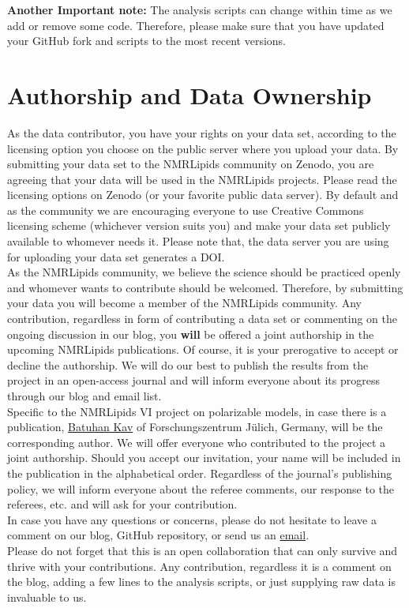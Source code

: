 \documentclass[12pt]{article}
\begin{document}
\textbf{Another Important note:} The analysis scripts can change within time as we add or remove some code. Therefore, please make sure that you have updated your GitHub fork and scripts to the most recent versions.

\section{Authorship and Data Ownership}

As the data contributor, you have your rights on your data set, according to the licensing option you choose on the public server where you upload your data. By submitting your data set to the NMRLipids community on Zenodo, you are agreeing that your data will be used in the NMRLipids projects. Please read the licensing options on Zenodo (or your favorite public data server). By default and as the community we are encouraging everyone to use Creative Commons licensing scheme (whichever version suits you) and make your data set publicly available to whomever needs it. Please note that, the data server you are using for uploading your data set generates a DOI.\\

As the NMRLipids community, we believe the science should be practiced openly and whomever wants to contribute should be welcomed. Therefore, by submitting your data you will become a member of the NMRLipids community. Any contribution, regardless in form of contributing a data set or commenting on the ongoing discussion in our blog, you \textbf{will} be offered a joint authorship in the upcoming NMRLipids publications. Of course, it is your prerogative to accept or decline the authorship. We will do our best to publish the results from the project in an open-access journal and will inform everyone about its progress through our blog and email list.\\

Specific to the NMRLipids VI project on polarizable models, in case there is a publication, \href{http://www.strodel.info/bkav.php}{Batuhan Kav} of Forschungszentrum Jülich, Germany, will be the corresponding author. We will offer everyone who contributed to the project a joint authorship. Should you accept our invitation, your name will be included in the publication in the alphabetical order. Regardless of the journal's publishing policy, we will inform everyone about the referee comments, our response to the referees, etc. and will ask for your contribution.\\

In case you have any questions or concerns, please do not hesitate to leave a comment on our blog, GitHub repository, or send us an \href{mailto:b.kav@fz-juelich.de}{email}.\\

Please do not forget that this is an open collaboration that can only survive and thrive with your contributions. Any contribution, regardless it is a comment on the blog, adding a few lines to the analysis scripts, or just supplying raw data is invaluable to us.\\
\end{document}
